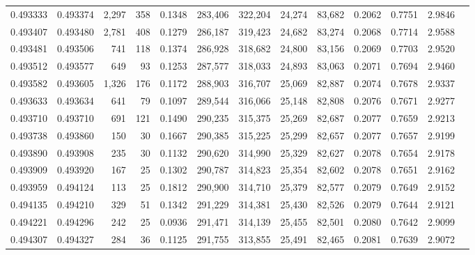 \begin{tabular}{rrrrrrrrrrrrr}
0.493333 & 0.493374 & 2,297 &   358 &                                     0.1348 & 283,406 & 322,204 &  24,274 &  83,682 & 0.2062 & 0.7751 & 2.9846 \\
0.493407 & 0.493480 & 2,781 &   408 &                                     0.1279 & 286,187 & 319,423 &  24,682 &  83,274 & 0.2068 & 0.7714 & 2.9588 \\
0.493481 & 0.493506 &   741 &   118 &                                     0.1374 & 286,928 & 318,682 &  24,800 &  83,156 & 0.2069 & 0.7703 & 2.9520 \\
0.493512 & 0.493577 &   649 &    93 &                                     0.1253 & 287,577 & 318,033 &  24,893 &  83,063 & 0.2071 & 0.7694 & 2.9460 \\
0.493582 & 0.493605 & 1,326 &   176 &                                     0.1172 & 288,903 & 316,707 &  25,069 &  82,887 & 0.2074 & 0.7678 & 2.9337 \\
0.493633 & 0.493634 &   641 &    79 &                                     0.1097 & 289,544 & 316,066 &  25,148 &  82,808 & 0.2076 & 0.7671 & 2.9277 \\
0.493710 & 0.493710 &   691 &   121 &                                     0.1490 & 290,235 & 315,375 &  25,269 &  82,687 & 0.2077 & 0.7659 & 2.9213 \\
0.493738 & 0.493860 &   150 &    30 &                                     0.1667 & 290,385 & 315,225 &  25,299 &  82,657 & 0.2077 & 0.7657 & 2.9199 \\
0.493890 & 0.493908 &   235 &    30 &                                     0.1132 & 290,620 & 314,990 &  25,329 &  82,627 & 0.2078 & 0.7654 & 2.9178 \\
0.493909 & 0.493920 &   167 &    25 &                                     0.1302 & 290,787 & 314,823 &  25,354 &  82,602 & 0.2078 & 0.7651 & 2.9162 \\
0.493959 & 0.494124 &   113 &    25 &                                     0.1812 & 290,900 & 314,710 &  25,379 &  82,577 & 0.2079 & 0.7649 & 2.9152 \\
0.494135 & 0.494210 &   329 &    51 &                                     0.1342 & 291,229 & 314,381 &  25,430 &  82,526 & 0.2079 & 0.7644 & 2.9121 \\
0.494221 & 0.494296 &   242 &    25 &                                     0.0936 & 291,471 & 314,139 &  25,455 &  82,501 & 0.2080 & 0.7642 & 2.9099 \\
0.494307 & 0.494327 &   284 &    36 &                                     0.1125 & 291,755 & 313,855 &  25,491 &  82,465 & 0.2081 & 0.7639 & 2.9072 \\

\end{tabular}
